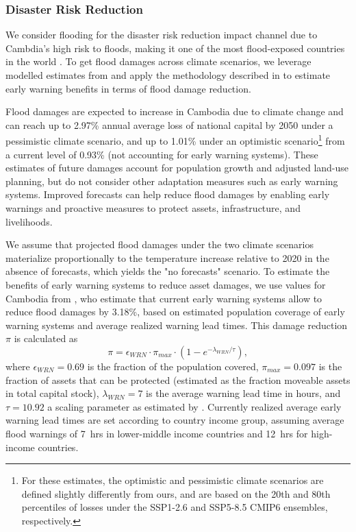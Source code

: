 \documentclass[
  final,
  10pt,
  letterpaper,
  english,
]{article}
\begin{document}
\subsubsection{Disaster Risk Reduction}
\label{sec:methods_drr}

We consider flooding for the disaster risk reduction impact channel due to
Cambdia's high risk to floods, making it one of the most flood-exposed countries
in the world \parencite{wbadb2021climate_risk_cambodia}. To get flood damages
across climate scenarios, we leverage modelled estimates from
\textcite{worldbank2023ccdr} and apply the methodology described in
\textcite{middelanis2025warning} to estimate early warning benefits in terms of
flood damage reduction.

Flood damages are expected to increase in Cambodia due to climate change and can
reach up to 2.97\% annual average loss of national capital by 2050 under a
pessimistic climate scenario, and up to 1.01\% under an optimistic
scenario\footnote{For these estimates, the optimistic and pessimistic climate
scenarios are defined slightly differently from ours, and are based on the 20th
and 80th percentiles of losses under the SSP1-2.6 and SSP5-8.5 CMIP6 ensembles,
respectively.} from a current level of 0.93\% \parencite{worldbank2023ccdr} (not
accounting for early warning systems). These estimates of future damages account
for population growth and adjusted land-use planning, but do not consider other
adaptation measures such as early warning systems. Improved forecasts can help
reduce flood damages by enabling early warnings and proactive measures to
protect assets, infrastructure, and livelihoods. 

We assume that projected flood damages under the two climate scenarios
materialize proportionally to the temperature increase relative to 2020 in the
absence of forecasts, which yields the "no forecasts" scenario. To estimate the
benefits of early warning systems to reduce asset damages, we use values for
Cambodia from \textcite{middelanis2025warning}, who estimate that current early
warning systems allow to reduce flood damages by 3.18\%, based on estimated
population coverage of early warning systems and average realized warning lead
times. This damage reduction $\pi$ is calculated as
\begin{equation}
  \pi = \epsilon_{WRN} \cdot \pi_{max} \cdot \left(1 - e^{-\lambda_{WRN}/\tau}\right),
\end{equation}
where $\epsilon_{WRN}=0.69$ is the fraction of the population covered,
$\pi_{max}=0.097$ is the fraction of assets that can be protected (estimated as
the fraction moveable assets in total capital stock), $\lambda_{WRN}=7$ is
the average warning lead time in hours, and $\tau=10.92$ a scaling parameter as
estimated by \textcite{middelanis2025warning}. Currently realized average early
warning lead times are set according to country income group, assuming average
flood warnings of 7~hrs in lower-middle income countries and 12~hrs for
high-income countries.
\end{document}
